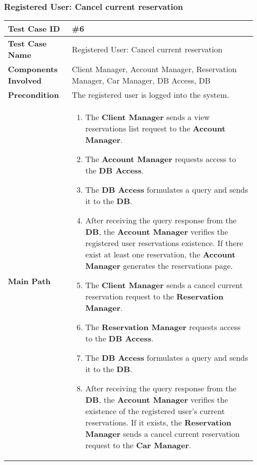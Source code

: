 \subsubsection{Registered User: Cancel current reservation}
\begin{center}
	\begin{tabular} { | m{4.5cm} | m{8.5cm} | }
		\hline
		\textbf{Test Case ID} & \#6\\
		\hline
		\textbf{Test Case Name} & Registered User: Cancel current reservation\\
		\hline
		\textbf{Components Involved} & Client Manager, Account Manager, Reservation Manager, Car Manager, DB Access, DB\\
		\hline
		\textbf{Precondition} & The registered user is logged into the system.\\
		\hline 
		\textbf{Main Path} & 
		\begin{enumerate}
			\item The \textbf{Client Manager} sends a view reservations list request to the \textbf{Account Manager}.
			\item The \textbf{Account Manager} requests access to the \textbf{DB Access}.
			\item The \textbf{DB Access} formulates a query and sends it to the \textbf{DB}.
			\item After receiving the query response from the \textbf{DB}, the \textbf{Account Manager} verifies the registered user reservations existence. If there exist at least one reservation, the \textbf{Account Manager} generates the reservations page. 
			\item The \textbf{Client Manager} sends a cancel current reservation request to the \textbf{Reservation Manager}.
			\item The \textbf{Reservation Manager} requests access to the \textbf{DB Access}.
			\item The \textbf{DB Access} formulates a query and sends it to the \textbf{DB}.
			\item After receiving the query response from the \textbf{DB}, the \textbf{Account Manager} verifies the existence of the registered user's current reservations. If it exists, the \textbf{Reservation Manager} sends a cancel current reservation request to the \textbf{Car Manager}.
		\end{enumerate}\\
	\end{tabular}
\end{center}
		
